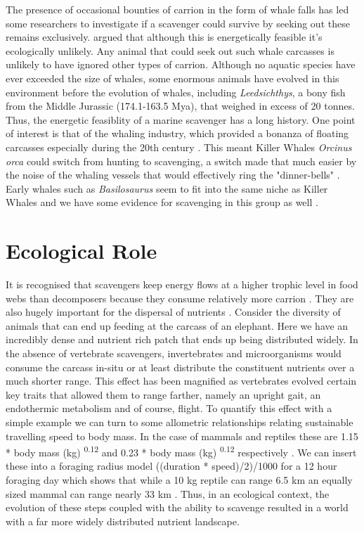 \documentclass[a4paper,12pt]{article}
\begin{document}
The presence of occasional bounties of carrion in the form of whale falls has led some researchers to investigate if a scavenger could survive by seeking out these remains exclusively. \cite{ruxton2005searching} argued that although this is energetically feasible it's ecologically unlikely. Any animal that could seek out such whale carcasses is unlikely to have ignored other types of carrion. Although no aquatic species have ever exceeded the size of whales, some enormous animals have evolved in this environment before the evolution of whales, including \textit{Leedsichthys}, a bony fish from the Middle Jurassic (174.1-163.5 Mya), that weighed in excess of 20 tonnes. Thus, the energetic feasiblity of a marine scavenger has a long history. One point of interest is that of the whaling industry, which provided a bonanza of floating carcasses especially during the 20th century \citep{Whitehead415}. This meant Killer Whales \textit{Orcinus orca} could switch from hunting to scavenging, a switch made that much easier by the noise of the whaling vessels that would effectively ring the "dinner-bells" \citep{Whitehead415}. Early whales such as \textit{Basilosaurus} seem to fit into the same niche as Killer Whales and we have some evidence for scavenging in this group as well \citep{fahlke2012bite}. 

\section*{Ecological Role}
It is recognised that scavengers keep energy flows at a higher trophic level in food webs than decomposers because they consume relatively more carrion \citep{devault2003scavenging}. They are also hugely important for the dispersal of nutrients \citep{benbow2015introduction}. Consider the diversity of animals that can end up feeding at the carcass of an elephant. Here we have an incredibly dense and nutrient rich patch that ends up being distributed widely. In the absence of vertebrate scavengers, invertebrates and microorganisms would consume the carcass in-situ or at least distribute the constituent nutrients over a much shorter range. This effect has been magnified as vertebrates evolved certain key traits that allowed them to range farther, namely an upright gait, an endothermic metabolism and of course, flight. To quantify this effect with a simple example we can turn to some allometric relationships relating sustainable travelling speed to body mass. In the case of mammals and reptiles these are 1.15 * body mass (kg) \textsuperscript{0.12} and 0.23 * body mass (kg) \textsuperscript{0.12}
respectively \citep{ruxton2004obligate}. We can insert these into a foraging radius model ((duration * speed)/2)/1000 for a 12 hour foraging day which shows that while a 10 kg reptile can range 6.5 km an equally sized mammal can range nearly 33 km \citep{Enstipp2006Energetics}. Thus, in an ecological context, the evolution of these steps coupled with the ability to scavenge resulted in a world with a far more widely distributed nutrient landscape. 
\end{document}
